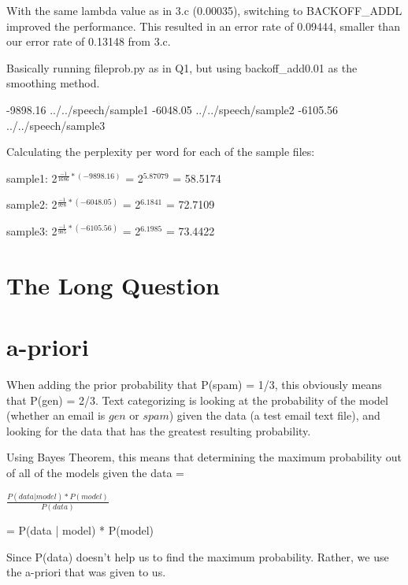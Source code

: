 \documentclass[12pt, letterpaper]{article}
\begin{document}

With the same lambda value as in 3.c (0.00035), switching to BACKOFF\_ADDL improved the performance. This resulted in an error rate of 0.09444, smaller than our error rate of 0.13148 from 3.c.


Basically running fileprob.py as in Q1, but using backoff\_add0.01 as the smoothing method.

-9898.16	../../speech/sample1
-6048.05	../../speech/sample2
-6105.56	../../speech/sample3

Calculating the perplexity per word for each of the sample files:

sample1: 2$^{\frac{-1}{1686} * (-9898.16)}$ = 2$^{5.87079}$ = 58.5174

sample2: 2$^{\frac{-1}{978} * (-6048.05)}$ = 2$^{6.1841}$ = 72.7109

sample3: 2$^{\frac{-1}{985} * (-6105.56)}$ = 2$^{6.1985}$ = 73.4422

\section{The Long Question}

\section{a-priori}

When adding the prior probability that P(spam) = 1/3, this obviously means that P(gen) = 2/3. Text categorizing is looking at the probability of the model (whether an email is $gen$ or $spam$) given the data (a test email text file), and looking for the data that has the greatest resulting probability.

Using Bayes Theorem, this means that determining the maximum probability out of all of the models given the data = 

$\frac{P(data | model) * P(model)}{P(data)}$ 

= P(data | model) * P(model)

Since P(data) doesn't help us to find the maximum probability. Rather, we use the a-priori that was given to us. 

\end{document}

